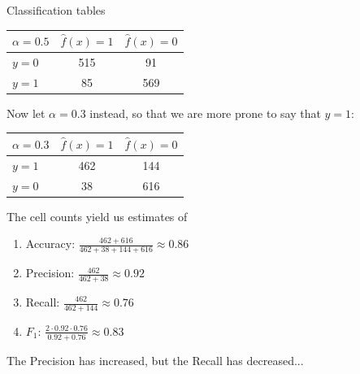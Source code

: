 \documentclass[10pt,handout]{beamer}
\begin{document}
\begin{frame}{Classification tables}

\begin{center}
\begin{tabular}{ l | c | c }
 {\color{uured}$\alpha=0.5$} & $\hat{f}(x)=1$ & $\hat{f}(x)=0$\\
  \hline
  $y=0$ & 515 & 91 \\
  $y=1$ & 85 & 569 \\
  \hline
\end{tabular}
\end{center}
\pause
Now let $\alpha=0.3$ instead, so that we are more prone to say that $\hat{y}=1$:
\begin{center}
\begin{tabular}{ l | c | c }
  {\color{uured}$\alpha=0.3$} & $\hat{f}(x)=1$ & $\hat{f}(x)=0$\\
  \hline
  $y=1$ & 462 & 144 \\
  $y=0$ & 38 & 616 \\
  \hline
\end{tabular}
\end{center}
The cell counts yield us estimates of
\begin{enumerate}
\item Accuracy: $\frac{462+616}{462+38+144+616}\approx 0.86$
\item Precision: $\frac{462}{462+38}\approx 0.92$
\item Recall: $\frac{462}{462+144}\approx 0.76$
\item $F_1$: $\frac{2 \cdot 0.92 \cdot 0.76}{0.92 + 0.76}\approx 0.83$
\end{enumerate}

The Precision has increased, but the Recall has decreased...

\end{frame}
\end{document}
